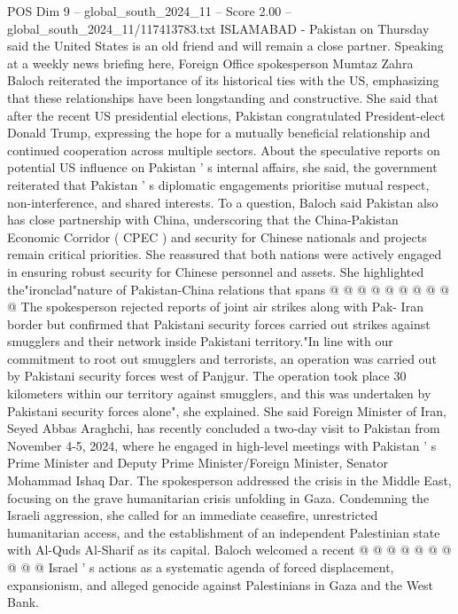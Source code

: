 \begin{textsample}{POS Dim 9 – global\_south\_2024\_11 – Score 2.00 – global\_south\_2024\_11/117413783.txt}  \label{ex:f9_pos_031}
ISLAMABAD - Pakistan on Thursday said the United States is an old friend and will remain a close partner.
Speaking at a weekly news briefing here, Foreign Office spokesperson Mumtaz Zahra Baloch reiterated the importance of its historical ties with the US, emphasizing that these relationships have been longstanding and constructive.
She said that after the recent US presidential elections, Pakistan congratulated President-elect Donald Trump, expressing the hope for a mutually beneficial relationship and continued cooperation across multiple sectors.
About the speculative reports on potential US influence on Pakistan ' s internal affairs, she said, the government reiterated that Pakistan ' s diplomatic engagements prioritise mutual respect, non-interference, and shared interests.
To a question, Baloch said Pakistan also has close partnership with China, underscoring that the China-Pakistan Economic Corridor ( CPEC ) and security for Chinese nationals and projects remain critical priorities.
She reassured that both nations were actively engaged in ensuring robust security for Chinese personnel and assets.
She highlighted the"ironclad"nature of Pakistan-China relations that spans @ @ @ @ @ @ @ @ @ @ The spokesperson rejected reports of joint air strikes along with Pak- Iran border but confirmed that Pakistani security forces carried out strikes against smugglers and their network inside Pakistani territory."In line with our commitment to root out smugglers and terrorists, an operation was carried out by Pakistani security forces west of Panjgur.
The operation took place 30 kilometers within our territory against smugglers, and this was undertaken by Pakistani security forces alone", she explained.
She said Foreign Minister of Iran, Seyed Abbas Araghchi, has recently concluded a two-day visit to Pakistan from November 4-5, 2024, where he engaged in high-level meetings with Pakistan ' s Prime Minister and Deputy Prime Minister/Foreign Minister, Senator Mohammad Ishaq Dar.
The spokesperson addressed the crisis in the Middle East, focusing on the grave humanitarian crisis unfolding in Gaza.
Condemning the Israeli aggression, she called for an immediate ceasefire, unrestricted humanitarian access, and the establishment of an independent Palestinian state with Al-Quds Al-Sharif as its capital.
Baloch welcomed a recent @ @ @ @ @ @ @ @ @ @ Israel ' s actions as a systematic agenda of forced displacement, expansionism, and alleged genocide against Palestinians in Gaza and the West Bank.

\end{textsample}
